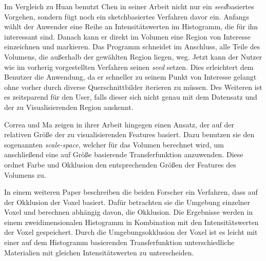 Im Vergleich zu Huan \cite{huang2003rgvis} benutzt Chen  in seiner Arbeit \cite{chen2006sketch} nicht nur ein \textit{seed}basiertes Vorgehen, sondern fügt noch ein sketchbasiertes Verfahren davor ein.
Anfangs wählt der Anwender eine Reihe an Intensitätswerten im Histogramm, die für ihn interessant sind. Danach kann er direkt im Volumen eine Region von Interesse einzeichnen und markieren. Das Programm schneidet im Anschluss, alle Teile des Volumens, die außerhalb der gewählten Region liegen, weg. Jetzt kann der Nutzer wie im vorherig vorgestellten Verfahren seinen \textit{seed} setzen.
Dies erleichtert dem Benutzer die Anwendung, da er schneller zu seinem Punkt von Interesse gelangt ohne vorher durch diverse Querschnittbilder iterieren zu müssen. Des Weiteren ist es zeitsparend für den User, falls dieser sich nicht genau mit dem Datensatz und der zu Visualisierenden Region auskennt.


Correa und Ma zeigen in ihrer Arbeit \cite{correa2008size} hingegen einen Ansatz, der auf der relativen Größe der zu visualisierenden Features basiert.
Dazu benutzen sie den sogenannten \textit{scale-space}, welcher für das Volumen berechnet wird, um anschließend eine auf Größe basierende Transferfunktion anzuwenden. Diese ordnet Farbe und Okklusion den entsprechenden Größen der Features des Volumens zu.


In einem weiteren Paper \cite{correa2009occlusion} beschreiben die beiden Forscher ein Verfahren, dass auf der Okklusion der Voxel basiert.
Dafür betrachten sie die Umgebung einzelner Voxel und berechnen abhängig davon, die Okklusion. Die Ergebnisse werden in einem zweidimensionalen Histogramm in Kombination mit den Intensitätswerten der Voxel gespeichert.
Durch die Umgebungsokklusion der Voxel ist es leicht mit einer auf dem Histogramm basierenden Transferfunktion unterschiedliche Materialien mit gleichen Intensitätswerten zu unterscheiden.


